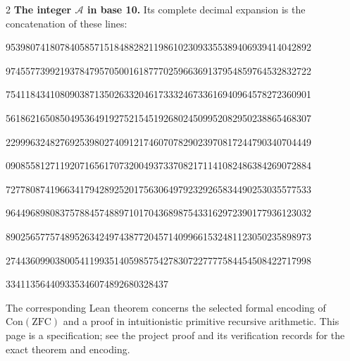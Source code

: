 \documentclass[10pt]{article}
\begin{document}
\begin{multicols}{2}
\textbf{The integer $\mathcal A$ in base 10.}
Its complete decimal expansion is the concatenation of these lines:\par
\begingroup\fontsize{7.7}{8.2}\selectfont{}\par
95398074180784058571518488282119861023093355389406939414042892\par
97455773992193784795705001618777025966369137954859764532832722\par
75411843410809038713502633204617333246733616940964578272360901\par
56186216508504953649192752154519268024509952082950238865468307\par
22999632482769253980274091217460707829023970817244790340704449\par
09085581271192071656170732004937337082171141082486384269072884\par
72778087419663417942892520175630649792329265834490253035577533\par
96449689808375788457488971017043689875433162972390177936123032\par
89025657757489526342497438772045714099661532481123050235898973\par
27443609903800541199351405985754278307227777584454508422717998\par
334113564409335346074892680328437\par
\endgroup
\normalfont\fontsize{7.7}{8.2}\selectfont
The corresponding Lean theorem concerns the selected formal encoding of
$\mathrm{Con}(\mathrm{ZFC})$ and a proof in intuitionistic primitive recursive
arithmetic. This page is a specification; see the project proof and its
verification records for the exact theorem and encoding.
\end{multicols}
\end{document}
